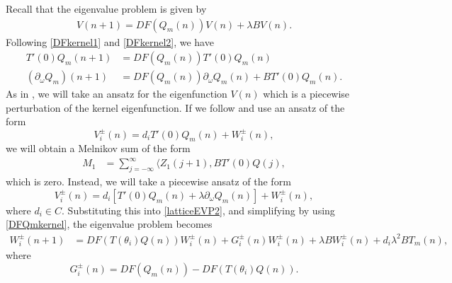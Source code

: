\documentclass[12pt]{elsarticle}
\begin{document}
Recall that the eigenvalue problem is given by 
\begin{align}\label{latticeEVP2}
V(n+1) = DF(Q_m(n)) V(n) + \lambda B V(n).
\end{align}
Following \cref{DFkernel1} and \cref{DFkernel2}, we have 
\begin{equation}\label{DFQmkernel}
\begin{aligned}
T'(0)Q_m(n+1) &= DF(Q_m(n))T'(0)Q_m(n) \\
(\partial_\omega Q_m)(n+1) &= DF(Q_m(n))\partial_\omega Q_m(n) + B T'(0)Q_m(n).
\end{aligned}
\end{equation}
As in \cite{Sandstede1998}, we will take an ansatz for the eigenfunction $V(n)$ which is a piecewise perturbation of the kernel eigenfunction. If we follow \cite{Sandstede1998} and use an ansatz of the form 
\begin{equation*}
V_i^\pm(n) = 
d_i T'(0)Q_m(n) + W_i^\pm(n),
\end{equation*}
we will obtain a Melnikov sum of the form
\begin{align*}
M_1 &= \sum_{j=-\infty}^\infty \langle Z_1(j+1), B T'(0)Q(j),
\end{align*}
which is zero. Instead, we will take a piecewise ansatz of the form
\begin{equation}\label{Viansatz2}
V_i^\pm(n) = 
d_i [ T'(0)Q_m(n) + \lambda \partial_\omega Q_m(n) ] + W_i^\pm(n),
\end{equation}
where $d_i \in C$. Substituting this into \cref{latticeEVP2}, and simplifying by using \cref{DFQmkernel}, the eigenvalue problem becomes
\begin{align}\label{Weq1}
W_i^\pm(n+1)
&= DF(T(\theta_i) Q(n) ) W_i^\pm(n) + G_i^\pm(n)W_i^\pm(n) + \lambda B W_i^\pm(n) + d_i \lambda^2 B T_m(n),
\end{align}
where
\begin{equation}
G_i^\pm(n) = DF(Q_m(n)) - DF(T(\theta_i) Q(n) ).
\end{equation}
\end{document}
